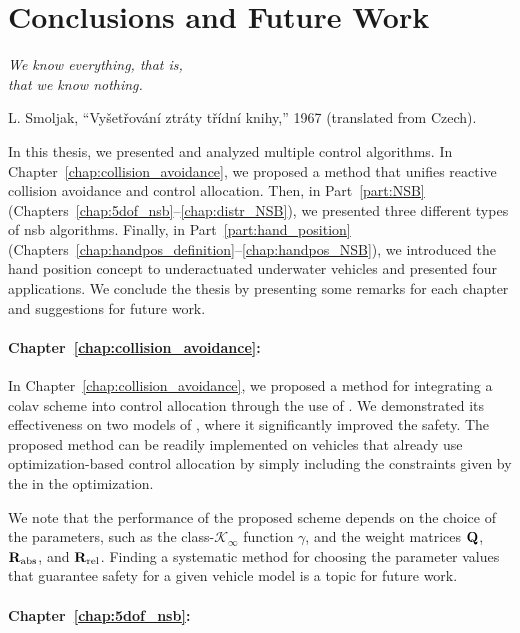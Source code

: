 \chapter{Conclusions and Future Work}
\label{part:conclusions}

\setlength{\epigraphwidth}{0.46\textwidth}
\epigraph{ \it
    We know everything, that is, \\
    that we know nothing.
}{
    L. Smoljak, ``Vyšetřování ztráty třídní knihy,'' 1967 (translated from Czech).
}

In this thesis, we presented and analyzed multiple control algorithms.
In Chapter~\ref{chap:collision_avoidance}, we proposed a method that unifies reactive collision avoidance and control allocation.
Then, in Part~\ref{part:NSB} (Chapters~\ref{chap:5dof_nsb}--\ref{chap:distr_NSB}), we presented three different types of \acrlong{nsb} algorithms.
Finally, in Part~\ref{part:hand_position} (Chapters~\ref{chap:handpos_definition}--\ref{chap:handpos_NSB}), we introduced the hand position concept to underactuated underwater vehicles and presented four applications.
We conclude the thesis by presenting some remarks for each chapter and suggestions for future work.

\subsubsection{Chapter~\ref{chap:collision_avoidance}: }
In Chapter~\ref{chap:collision_avoidance}, we proposed a method for integrating a \acrfull{colav} scheme into control allocation through the use of .
We demonstrated its effectiveness on two models of , where it significantly improved the safety.
The proposed method can be readily implemented on vehicles that already use optimization-based control allocation by simply including the constraints given by the  in the optimization.

We note that the performance of the proposed scheme depends on the choice of the parameters, such as the class-$\mathcal{K}_{\infty}$ function $\gamma$, and the weight matrices $\mathbf{Q}$, $\mathbf{R}_{\rm abs}$, and $\mathbf{R}_{\rm rel}$.
Finding a systematic method for choosing the parameter values that guarantee safety for a given vehicle model is a topic for future work.

\subsubsection{Chapter~\ref{chap:5dof_nsb}: }

